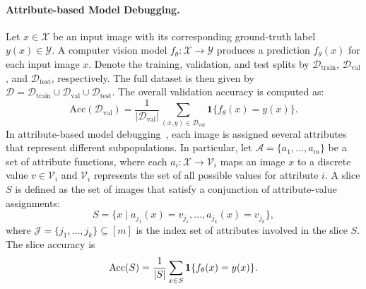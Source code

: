\documentclass[10pt]{article} %
\begin{document}
\paragraph{Attribute-based Model Debugging.}  
Let \(x \in \mathcal{X}\) be an input image with its corresponding ground-truth label \(y(x) \in \mathcal{Y}\). A computer vision model \(f_\theta \colon \mathcal{X} \to \mathcal{Y}\) produces a prediction \(f_\theta(x)\) for each input image \(x\). Denote the training, validation, and test splits by \(\mathcal{D}_{\mathrm{train}}\), \(\mathcal{D}_{\mathrm{val}}\), and \(\mathcal{D}_{\mathrm{test}}\), respectively. The full dataset is then given by \(\mathcal{D} = \mathcal{D}_{\mathrm{train}} \cup \mathcal{D}_{\mathrm{val}} \cup \mathcal{D}_{\mathrm{test}}\). The overall validation accuracy is computed as: 
\begin{equation}
\mathrm{Acc}(\mathcal{D}_{\mathrm{val}})
=\frac{1}{|\mathcal{D}_{\mathrm{val}}|}
\sum_{(x, y) \in \mathcal{D}_{\mathrm{val}}}
\mathbf{1}\{f_\theta(x) = y(x)\}.
\end{equation}
In attribute-based model debugging~\citep{chen2023hibug}, each image is assigned several attributes that represent different subpopulations. 
In particular, let \(\mathcal{A} = \{a_1, \dots, a_m\}\) be a set of attribute functions, where each \(a_i \colon \mathcal{X} \to \mathcal{V}_i\) maps an image \(x\) to a discrete value \(v \in \mathcal{V}_i\) and $\mathcal{V}_i$ represents the set of all possible values for attribute $i$. A slice $S$ is defined as the set of images that satisfy a conjunction of attribute-value assignments: 
\vspace{-5pt}
\begin{equation}
S = \{ x \mid a_{j_1}(x) = v_{j_1}, \dots, a_{j_k}(x) = v_{j_k}\},
\end{equation}
where \(\mathcal{J} = \{j_1, \dots, j_k\} \subseteq [m]\) is the index set of attributes involved in the slice \(S\).  
The slice accuracy is
\vspace{-5pt}
\begin{equation}
\mathrm{Acc}(S) = \frac{1}{|S|}\sum_{x\in S}\mathbf{1}\{f_\theta(x) = y(x)\}.
\vspace{-5pt}
\end{equation}

\vspace{-5pt}
\end{document}
